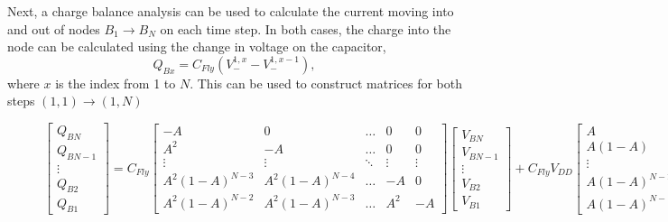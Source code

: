 \documentclass[conference]{IEEEtran}
\begin{document}
	Next, a charge balance analysis can be used to calculate the current moving into and out of nodes $B_1 \rightarrow B_N$ on each time step. In both cases, the charge into the node can be calculated using the change in voltage on the capacitor,
	\begin{equation}
	Q_{Bx} = C_{Fly}(V_-^{1,x} - V_-^{1,x-1}),
	\end{equation}
	where $x$ is the index from 1 to $N$. This can be used to construct matrices for both steps $(1,1)\rightarrow(1,N)$
	\begin{figure}
	\begin{equation}
	\begin{bmatrix}
	Q_{BN} \\
	Q_{BN-1} \\
	\vdots\\
	Q_{B2} \\ 
	Q_{B1}
	\end{bmatrix}\!
	= \!
	C_{Fly}\!
	\begin{bmatrix}
	-A \!& 0 & \dots & 0 & 0 \\
	A^2 \!& -A & \dots & 0 & 0\\
	\vdots & \vdots & \ddots & \vdots & \vdots \\
	A^2(1\!-\!A)^{N-3} \!& A^2(1\!-\!A)^{N-4} \!& \dots & -A & 0\\ 
	A^2(1\!-\!A)^{N-2} \!& A^2(1\!-\!A)^{N-3} \!& \dots & A^2 & -A 
	\end{bmatrix}\!\begin{bmatrix}
	V_{BN} \\
	V_{BN-1} \\
	\vdots \\
	V_{B2} \\
	V_{B1}
	\end{bmatrix}\!+ C_{Fly}V_{DD}\!\begin{bmatrix}
	A \\
	A(1-A) \\
	\vdots \\
	A(1\!-\!A)^{N-2} \\
	A(1\!-\!A)^{N-1}
	\end{bmatrix}
	\label{eq:Q_V1}
	\end{equation}	
	\end{figure}
	
\end{document}
